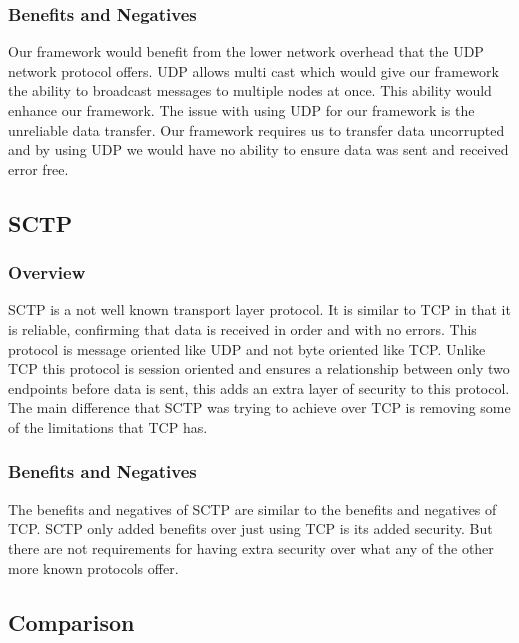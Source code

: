 \documentclass[draftclsnofoot, onecolumn, compsoc, 10pt]{IEEEtran}
\begin{document}
\subsubsection{Benefits and Negatives}
Our framework would benefit from the lower network overhead that the UDP network protocol offers. UDP allows multi cast which would give our framework the ability to broadcast messages to multiple nodes at once. This ability would enhance our framework. The issue with using UDP for our framework is the unreliable data transfer. Our framework requires us to transfer data uncorrupted and by using UDP we would have no ability to ensure data was sent and received error free.

\subsection{SCTP}
\subsubsection{Overview}
SCTP is a not well known transport layer protocol. It is similar to TCP in that it is reliable, confirming that data is received in order and with no errors. This protocol is message oriented like UDP and not byte oriented like TCP. Unlike TCP this protocol is session oriented and ensures a relationship between only two endpoints before data is sent, this adds an extra layer of security to this protocol. The main difference that SCTP was trying to achieve over TCP is removing some of the limitations that TCP has. \cite{realtime}

\subsubsection{Benefits and Negatives}
The benefits and negatives of SCTP are similar to the benefits and negatives of TCP. SCTP only added benefits over just using TCP is its added security. But there are not requirements for having extra security over what any of the other more known protocols offer.

\subsection{Comparison}
\end{document}
